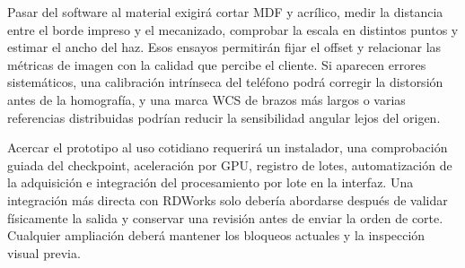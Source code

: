 Pasar del software al material exigirá cortar MDF y acrílico, medir la distancia entre el borde impreso y el mecanizado, comprobar la escala en distintos puntos y estimar el ancho del haz. Esos ensayos permitirán fijar el offset y relacionar las métricas de imagen con la calidad que percibe el cliente. Si aparecen errores sistemáticos, una calibración intrínseca del teléfono podrá corregir la distorsión antes de la homografía, y una marca WCS de brazos más largos o varias referencias distribuidas podrían reducir la sensibilidad angular lejos del origen.

Acercar el prototipo al uso cotidiano requerirá un instalador, una comprobación guiada del checkpoint, aceleración por GPU, registro de lotes, automatización de la adquisición e integración del procesamiento por lote en la interfaz. Una integración más directa con RDWorks solo debería abordarse después de validar físicamente la salida y conservar una revisión antes de enviar la orden de corte. Cualquier ampliación deberá mantener los bloqueos actuales y la inspección visual previa.
